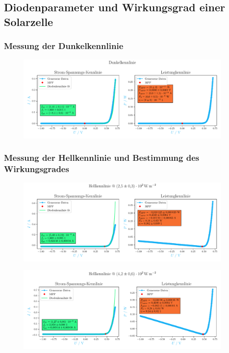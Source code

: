 \documentclass[12pt,english,ngerman]{scrartcl}
\begin{document}
\subsection{Diodenparameter und Wirkungsgrad einer Solarzelle}

\subsubsection{Messung der Dunkelkennlinie}

\begin{figure}[H]
	\centering
	\includegraphics[width=0.95\textwidth]{figures/dunkelkennlinie.pdf}
	\caption{}\label{fig:ausw_kennlinie_dunkel}
\end{figure}

\subsubsection{Messung der Hellkennlinie und Bestimmung des Wirkungsgrades}

\begin{figure}[H]
	\centering
	\includegraphics[width=0.95\textwidth]{figures/helllampe.pdf}
	\caption{}\label{fig:ausw_kennlinie_hell_lampe}
\end{figure}

\begin{figure}[H]
	\centering
	\includegraphics[width=0.95\textwidth]{figures/helllampe2.pdf}
	\caption{}\label{fig:ausw_kennlinie_hell_lampe2}
\end{figure}
\end{document}
